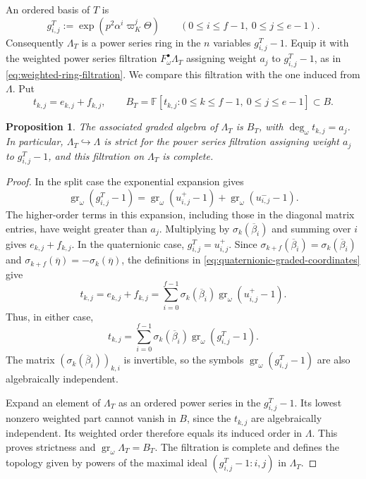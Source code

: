 \documentclass[11pt]{article}
\numberwithin{equation}{section}
\newtheorem{proposition}[theorem]{Proposition}
\theoremstyle{definition}
\theoremstyle{remark}
\newcommand{\F}{\mathbb F}
\DeclareMathOperator{\gr}{gr}
\begin{document}
An ordered basis of $T$ is
\[
 g^T_{i,j}:=\exp(p^2\alpha^i\varpi_K^j\Theta)
 \qquad(0\leq i\leq f-1,\ 0\leq j\leq e-1).
\]
Consequently $\Lambda_T$ is a power series ring in the $n$ variables
$g^T_{i,j}-1$. Equip it with the weighted power series filtration
$F_\omega^\bullet \Lambda_T$
assigning weight $a_j$ to $g^T_{i,j}-1$, as in
\eqref{eq:weighted-ring-filtration}. We compare this filtration
with the one induced from $\Lambda$. Put
\[
 t_{k,j}=e_{k,j}+f_{k,j},\qquad
 B_T=\F[t_{k,j}:0\leq k\leq f-1,\ 0\leq j\leq e-1]\subset B.
\]

\begin{proposition}\label{prop:torus-strictness}
The associated graded algebra of $\Lambda_T$ is $B_T$, with
$\deg_\omega t_{k,j}=a_j$. In particular, $\Lambda_T\hookrightarrow\Lambda$ is
strict for the power series filtration assigning weight $a_j$
to $g^T_{i,j}-1$, and this filtration on $\Lambda_T$ is complete.
\end{proposition}

\begin{proof}
In the split case the exponential expansion gives
\[
 \gr_\omega(g^T_{i,j}-1)
   =\gr_\omega(u^+_{i,j}-1)+\gr_\omega(u^-_{i,j}-1).
\]
The higher-order terms in this expansion, including those in the
diagonal matrix entries, have weight greater than $a_j$. Multiplying by
$\sigma_k(\overline\beta_i)$ and summing over $i$ gives
$e_{k,j}+f_{k,j}$. In the quaternionic case,
$g^T_{i,j}=u^+_{i,j}$. Since
$\sigma_{k+f}(\overline\beta_i)=\sigma_k(\overline\beta_i)$ and
$\sigma_{k+f}(\overline\eta)=-\sigma_k(\overline\eta)$,
the definitions in \eqref{eq:quaternionic-graded-coordinates} give
\[
 t_{k,j}=e_{k,j}+f_{k,j}
   =\sum_{i=0}^{f-1}\sigma_k(\overline\beta_i)
                         \gr_\omega(u^+_{i,j}-1).
\]
Thus, in either case,
\[
 t_{k,j}=\sum_{i=0}^{f-1}\sigma_k(\overline\beta_i)
                    \gr_\omega(g^T_{i,j}-1).
\]
The matrix $(\sigma_k(\overline\beta_i))_{k,i}$ is invertible,
so the symbols $\gr_\omega(g^T_{i,j}-1)$ are also
algebraically independent.

Expand an element of $\Lambda_T$ as an ordered power series in the
$g^T_{i,j}-1$. Its lowest nonzero weighted part cannot vanish in $B$,
since the $t_{k,j}$ are algebraically independent. Its weighted order
therefore equals its induced order in $\Lambda$. This proves strictness
and $\gr_\omega \Lambda_T=B_T$. The filtration is complete and defines
the topology given by powers of the maximal ideal
$(g^T_{i,j}-1:i,j)$ in $\Lambda_T$.
\end{proof}
\end{document}
